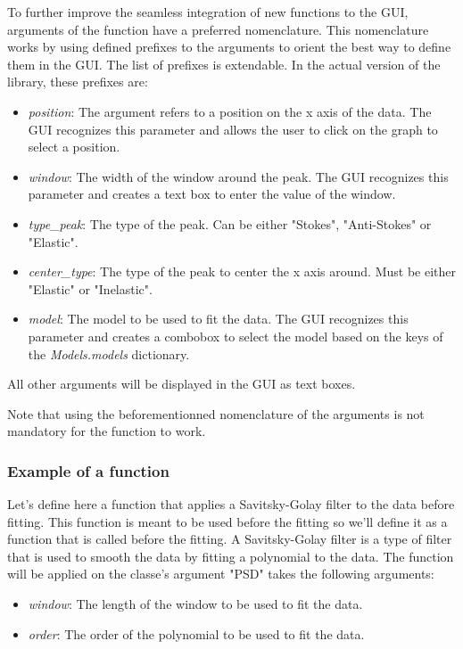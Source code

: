 To further improve the seamless integration of new functions to the GUI, arguments of the function have a preferred nomenclature. This nomenclature works by using defined prefixes to the arguments to orient the best way to define them in the GUI. The list of prefixes is extendable. In the actual version of the library, these prefixes are:
\begin{itemize}
    \item \textit{position}: The argument refers to a position on the x axis of the data. The GUI recognizes this parameter and allows the user to click on the graph to select a position.
    \item \textit{window}: The width of the window around the peak. The GUI recognizes this parameter and creates a text box to enter the value of the window.
    \item \textit{type\_peak}: The type of the peak. Can be either "Stokes", "Anti-Stokes" or "Elastic".
    \item \textit{center\_type}: The type of the peak to center the x axis around. Must be either "Elastic" or "Inelastic".
    \item \textit{model}: The model to be used to fit the data. The GUI recognizes this parameter and creates a combobox to select the model based on the keys of the \textit{Models.models} dictionary.
\end{itemize}

All other arguments will be displayed in the GUI as text boxes. 

Note that using the beforementionned nomenclature of the arguments is not mandatory for the function to work.

\subsubsection{Example of a function}

Let's define here a function that applies a Savitsky-Golay filter to the data before fitting. This function is meant to be used before the fitting so we'll define it as a function that is called before the fitting. A Savitsky-Golay filter is a type of filter that is used to smooth the data by fitting a polynomial to the data. The function will be applied on the classe's argument "PSD" takes the following arguments:
\begin{itemize}
    \item \textit{window}: The length of the window to be used to fit the data.
    \item \textit{order}: The order of the polynomial to be used to fit the data.
\end{itemize}

